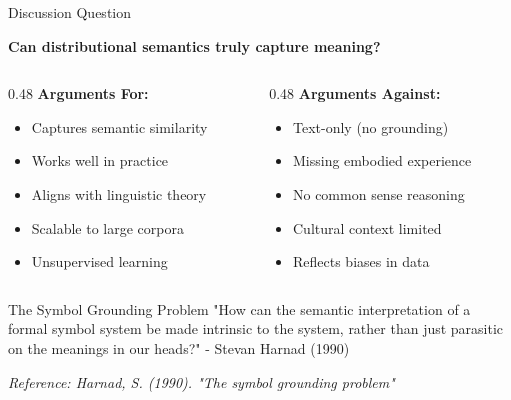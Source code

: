 \documentclass[aspectratio=169]{beamer}
\begin{document}
\begin{frame}[shrink=10]{Discussion Question 💬}
\begin{center}
\Large
\textbf{Can distributional semantics truly capture meaning?}
\end{center}

\vspace{1em}

\begin{columns}[T]
\begin{column}{0.48\textwidth}
\textbf{Arguments For:}
\begin{itemize}\setlength{\itemsep}{0pt}
    \item Captures semantic similarity
    \item Works well in practice
    \item Aligns with linguistic theory
    \item Scalable to large corpora
    \item Unsupervised learning
\end{itemize}
\end{column}

\begin{column}{0.48\textwidth}
\textbf{Arguments Against:}
\begin{itemize}\setlength{\itemsep}{0pt}
    \item Text-only (no grounding)
    \item Missing embodied experience
    \item No common sense reasoning
    \item Cultural context limited
    \item Reflects biases in data
\end{itemize}
\end{column}
\end{columns}

\vspace{1em}

\begin{alertblock}{The Symbol Grounding Problem}
"How can the semantic interpretation of a formal symbol system be made intrinsic to the system, rather than just parasitic on the meanings in our heads?" - Stevan Harnad (1990)
\end{alertblock}

\small
\textit{Reference: Harnad, S. (1990). "The symbol grounding problem"}
\end{frame}
\end{document}
